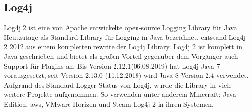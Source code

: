 
\subsection{Log4j}\label{subsec:log4j}
Log4j 2 ist eine von Apache entwickelte open-source Logging Library für Java.
Heutzutage als Standard-Library für Logging in Java bezeichnet, entstand Log4j 2 2012 aus einem kompletten rewrite der Log4j Library.
Log4j 2 ist komplett in Java geschrieben und bietet als großen Vorteil gegenüber dem Vorgänger auch Support für Plugins an.
Bis Version 2.12.1(06.08.2019) hat Log4j Java 7 vorausgesetzt, seit Version 2.13.0 (11.12.2019) wird Java 8 Version 2.4 verwendet.
Aufgrund des Standard-Logger Status von Log4j, wurde die Library in viele weitere Projekte aufgenommen.
So verwenden unter anderem Minecraft: Java Edition, \gls{aws}, VMware Horizon und Steam Log4j 2 in ihren Systemen.
